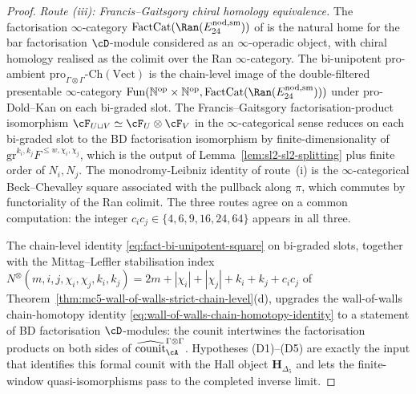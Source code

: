 \begin{proof}
\emph{Route (iii): Francis--Gaitsgory chiral homology equivalence.} The
factorisation $\infty$-category
$\mathrm{FactCat}(\Ran(E^{\mathrm{nod,sm}}_{24}))$ of
\cite{FrancisGaitsgory11} is the natural home for the bar factorisation
$\cD$-module considered as an $\infty$-operadic object, with chiral
homology realised as the colimit over the Ran $\infty$-category. The
bi-unipotent pro-ambient
$\mathrm{pro}_{\Gamma\otimes\Gamma}\text{-}\mathrm{Ch}(\mathrm{Vect})$ is
the chain-level image of the double-filtered presentable
$\infty$-category
$\mathrm{Fun}(\mathbb N^{\mathrm{op}}\times\mathbb N^{\mathrm{op}},
\mathrm{FactCat}(\Ran(E^{\mathrm{nod,sm}}_{24})))$ under pro-Dold--Kan
on each bi-graded slot. The Francis--Gaitsgory factorisation-product
isomorphism
$\cF_{U\sqcup V}\simeq \cF_U\otimes\cF_V$ in the $\infty$-categorical
sense reduces on each bi-graded slot to the BD factorisation isomorphism
by finite-dimensionality of
$\mathrm{gr}^{k_i,k_j}F^{\leq w,\chi_i,\chi_j}$, which is the
output of Lemma~\textup{\ref{lem:sl2-sl2-splitting}} plus
finite order of $N_i,N_j$. The monodromy-Leibniz identity of route~(i) is
the $\infty$-categorical Beck--Chevalley square associated with the
pullback along $\pi$, which commutes by functoriality of the Ran
colimit. The three routes agree on a common computation: the integer
$c_ic_j\in\{4,6,9,16,24,64\}$ appears in all three.

The chain-level identity
\eqref{eq:fact-bi-unipotent-square} on bi-graded slots, together with
the Mittag--Leffler stabilisation index
$N^{\otimes}(m,i,j,\chi_i,\chi_j,k_i,k_j)=2m+|\chi_i|+|\chi_j|+k_i+k_j+c_ic_j$
of Theorem~\textup{\ref{thm:mc5-wall-of-walls-strict-chain-level}}(d),
upgrades the wall-of-walls chain-homotopy identity
\eqref{eq:wall-of-walls-chain-homotopy-identity} to a statement of BD
factorisation $\cD$-modules: the counit intertwines the factorisation
products on both sides of
$\widehat{\mathrm{counit}}^{\Gamma\otimes\Gamma}_\cA$. Hypotheses
\textup{(D1)--(D5)} are exactly the input that identifies this formal
counit with the Hall object $\mathbf H_{\Delta_5}$ and lets the
finite-window quasi-isomorphisms pass to the completed inverse limit.
\end{proof}

